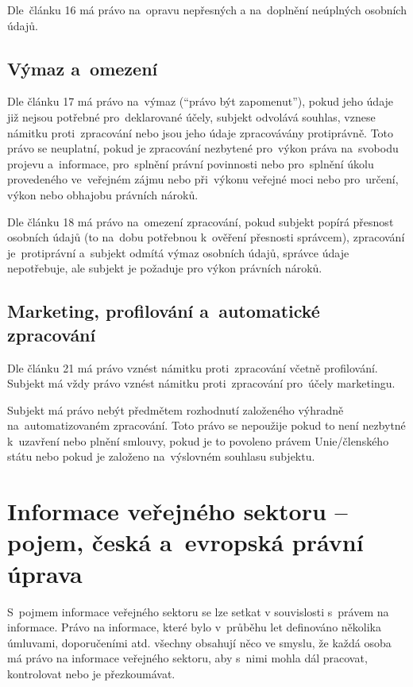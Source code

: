 Dle~článku 16 má právo na~opravu nepřesných a na~doplnění neúplných osobních údajů.

\subsection*{Výmaz a~omezení}

Dle článku 17 má právo na~výmaz (\enquote{právo být zapomenut}), pokud jeho údaje již nejsou potřebné pro~deklarované účely, subjekt odvolává souhlas, vznese námitku proti~zpracování nebo jsou jeho údaje zpracovávány protiprávně. Toto právo se neuplatní, pokud je zpracování nezbytené pro~výkon práva na~svobodu projevu a~informace, pro~splnění právní povinnosti nebo pro~splnění úkolu provedeného ve~veřejném zájmu nebo při~výkonu veřejné moci nebo pro~určení, výkon nebo obhajobu právních nároků.

Dle článku 18 má právo na~omezení zpracování, pokud subjekt popírá přesnost osobních údajů (to na~dobu potřebnou k~ověření přesnosti správcem), zpracování je~protiprávní a~subjekt odmítá výmaz osobních údajů, správce údaje nepotřebuje, ale subjekt je požaduje pro výkon právních nároků.

\subsection*{Marketing, profilování a~automatické zpracování}

Dle článku 21 má právo vznést námitku proti~zpracování včetně profilování. Subjekt má vždy právo vznést námitku proti~zpracování pro~účely marketingu.

Subjekt má právo nebýt předmětem rozhodnutí založeného výhradně na~automatizovaném zpracování. Toto právo se nepoužije pokud to není nezbytné k~uzavření nebo plnění smlouvy, pokud je to povoleno právem Unie/členského státu nebo pokud je založeno na~výslovném souhlasu subjektu.

\clearpage
\section{Informace veřejného sektoru -- pojem, česká a~evropská právní úprava}

S~pojmem informace veřejného sektoru se lze setkat v souvislosti s~právem na informace. Právo na informace, které bylo v~průběhu let definováno několika úmluvami, doporučeními atd. všechny obsahují něco ve smyslu, že každá osoba má právo na informace veřejného sektoru, aby s~nimi mohla dál pracovat, kontrolovat nebo je přezkoumávat.

